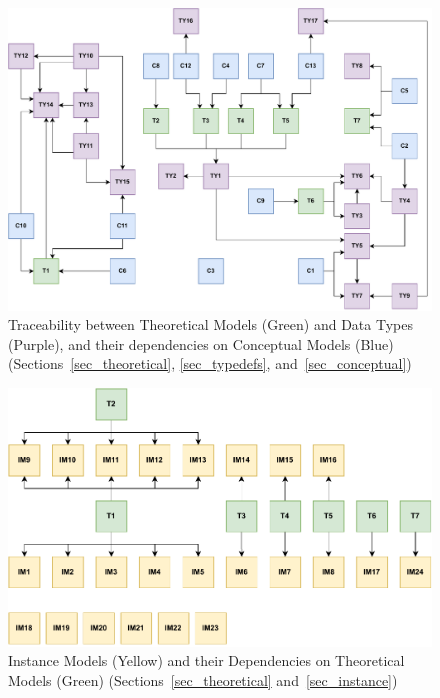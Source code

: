 \begin{landscape}
    \begin{figure}[tbh]
        \centering
        \includegraphics[width=0.93\linewidth]{figures/concept2types_revised.pdf}
        \caption[Traceability between Theoretical Models and Data Types, and
        their dependencies on Conceptual Models]{Traceability between
        Theoretical Models (Green) and Data Types (Purple), and their
        dependencies on Conceptual Models (Blue)
        (Sections~\ref{sec_theoretical}, \ref{sec_typedefs},
        and~\ref{sec_conceptual})}
        \label{fig:C2TY}
    \end{figure}
\end{landscape}

\begin{landscape}
    \vspace*{\fill}
    \begin{figure}[tbh]
        \centering
        \includegraphics[width=0.85\linewidth]{figures/theoretical2instance.pdf}
        \caption[Instance Models and their Dependencies on Theoretical
        Models]{Instance Models (Yellow) and their Dependencies on
        Theoretical Models (Green) (Sections~\ref{sec_theoretical}
        and~\ref{sec_instance})}
        \label{fig:T2IM}
    \end{figure}
    \vspace*{\fill}
\end{landscape}

